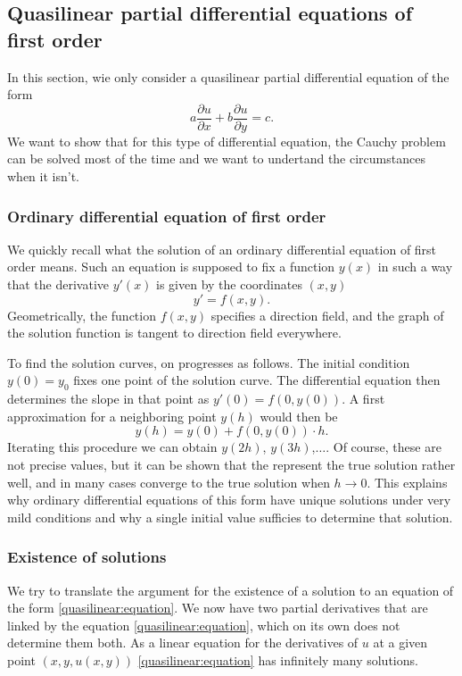 \subsection{Quasilinear partial differential equations of first order}
In this section, wie only consider a quasilinear partial differential
equation of the form
\begin{equation}
a\frac{\partial u}{\partial x}
+
b\frac{\partial u}{\partial y}
=
c.
\label{quasilinear:equation}
\end{equation}
We want to show that for this type of differential equation, the
Cauchy problem can be solved most of the time and we want to undertand
the circumstances when it isn't.

\subsubsection{Ordinary differential equation of first order}
We quickly recall what the solution of an ordinary differential equation
of first order means.
Such an equation is supposed to fix a function $y(x)$ in such a way
that the derivative $y'(x)$ is given by the coordinates $(x,y)$
\[
y'=f(x,y).
\]
Geometrically, the function $f(x,y)$ specifies a direction field,
and the graph of the solution function is tangent to direction
field everywhere.

To find the solution curves, on progresses as follows.
The initial condition $y(0)=y_0$ fixes one point of the solution
curve.
The differential equation then determines the slope in that point
as $y'(0)=f(0,y(0))$.
A first approximation for a neighboring point $y(h)$ would then be
\begin{equation}
y(h)=y(0)+f(0,y(0))\cdot h.
\label{quasilinear:euler}
\end{equation}
Iterating this procedure we can obtain $y(2h)$, $y(3h)$,$\dots$.
Of course, these are not precise values, but it can be shown that
the represent the true solution rather well, and in many cases
converge to the true solution when $h\to 0$.
This explains why ordinary differential equations of this form have
unique solutions under very mild conditions and why a single
initial value sufficies to determine that solution.

\subsubsection{Existence of solutions}
We try to translate the argument for the existence of a solution to
an equation of the form \eqref{quasilinear:equation}.
We now have two partial derivatives that are linked by the equation
\eqref{quasilinear:equation}, which on its own does not determine
them both.
As a linear equation for the derivatives of $u$ at a given point
$(x,y,u(x,y))$
\eqref{quasilinear:equation} has infinitely many solutions.

